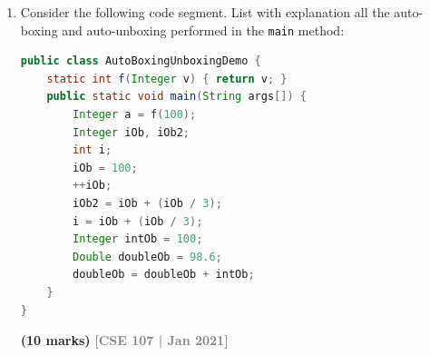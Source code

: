 \documentclass[12pt,a3paper]{article}
\newcommand{\yr}[1]{\hfill\textcolor{gray}{\small\textbf{[#1]}}}
\newcommand{\mk}[1]{\textcolor{orange!70!black}{\small\textbf{(#1 marks)}}}
\begin{document}
\begin{enumerate}
\item Consider the following code segment. List with explanation all the auto-boxing and auto-unboxing performed in the \texttt{main} method:
\begin{lstlisting}[language=Java]
public class AutoBoxingUnboxingDemo {
    static int f(Integer v) { return v; }
    public static void main(String args[]) {
        Integer a = f(100);
        Integer iOb, iOb2;
        int i;
        iOb = 100;
        ++iOb;
        iOb2 = iOb + (iOb / 3);
        i = iOb + (iOb / 3);
        Integer intOb = 100;
        Double doubleOb = 98.6;
        doubleOb = doubleOb + intOb;
    }
}
\end{lstlisting}
\mk{10}
\yr{CSE 107 | Jan 2021}

\begin{tcolorbox}[enhanced,breakable,ansbox,
  colback=cB!4,colframe=cB,boxrule=0.8pt,arc=5pt,
  title={\textbf{Answer --- Autoboxing / Auto-Unboxing in \texttt{AutoBoxingUnboxingDemo}}},
  fonttitle=\bfseries\color{white},colbacktitle=cB]


\end{tcolorbox}
\end{enumerate}
\end{document}
